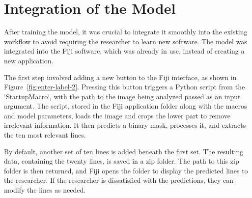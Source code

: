 \section{Integration of the Model}\label{sec:integ}

After training the model, it was crucial to integrate it smoothly into the existing workflow to avoid requiring the researcher to learn new software. The model was integrated into the Fiji software, which was already in use, instead of creating a new application.

The first step involved adding a new button to the Fiji interface, as shown in Figure~\ref{fig:enter-label-2}. Pressing this button triggers a Python script from the `StartupMacro`, with the path to the image being analyzed passed as an input argument. The script, stored in the Fiji application folder along with the macros and model parameters, loads the image and crops the lower part to remove irrelevant information. It then predicts a binary mask, processes it, and extracts the ten most relevant lines.

By default, another set of ten lines is added beneath the first set. The resulting data, containing the twenty lines, is saved in a zip folder. The path to this zip folder is then returned, and Fiji opens the folder to display the predicted lines to the researcher. If the researcher is dissatisfied with the predictions, they can modify the lines as needed.

